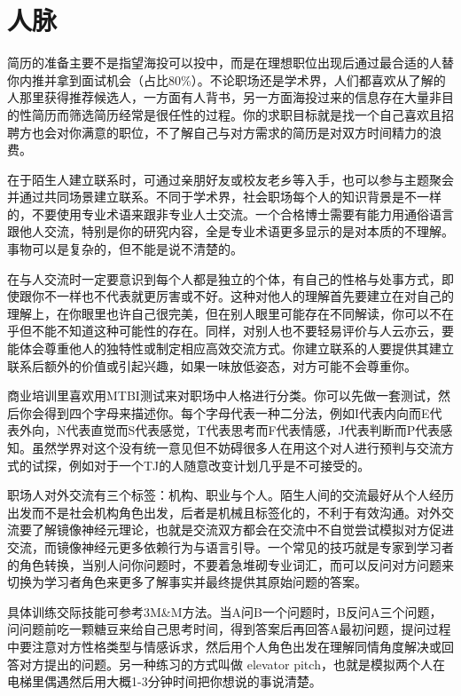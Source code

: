 \documentclass[]{tufte-book}
\begin{document}
\hypertarget{ux4ebaux8109}{%
\section{人脉}\label{ux4ebaux8109}}

简历的准备主要不是指望海投可以投中，而是在理想职位出现后通过最合适的人替你内推并拿到面试机会（占比80\%）。不论职场还是学术界，人们都喜欢从了解的人那里获得推荐候选人，一方面有人背书，另一方面海投过来的信息存在大量非目的性简历而筛选简历经常是很任性的过程。你的求职目标就是找一个自己喜欢且招聘方也会对你满意的职位，不了解自己与对方需求的简历是对双方时间精力的浪费。

在于陌生人建立联系时，可通过亲朋好友或校友老乡等入手，也可以参与主题聚会并通过共同场景建立联系。不同于学术界，社会职场每个人的知识背景是不一样的，不要使用专业术语来跟非专业人士交流。一个合格博士需要有能力用通俗语言跟他人交流，特别是你的研究内容，全是专业术语更多显示的是对本质的不理解。事物可以是复杂的，但不能是说不清楚的。

在与人交流时一定要意识到每个人都是独立的个体，有自己的性格与处事方式，即使跟你不一样也不代表就更厉害或不好。这种对他人的理解首先要建立在对自己的理解上，在你眼里也许自己很完美，但在别人眼里可能存在不同解读，你可以不在乎但不能不知道这种可能性的存在。同样，对别人也不要轻易评价与人云亦云，要能体会尊重他人的独特性或制定相应高效交流方式。你建立联系的人要提供其建立联系后额外的价值或引起兴趣，如果一味放低姿态，对方可能不会尊重你。

商业培训里喜欢用MTBI测试来对职场中人格进行分类。你可以先做一套测试，然后你会得到四个字母来描述你。每个字母代表一种二分法，例如I代表内向而E代表外向，N代表直觉而S代表感觉，T代表思考而F代表情感，J代表判断而P代表感知。虽然学界对这个没有统一意见但不妨碍很多人在用这个对人进行预判与交流方式的试探，例如对于一个TJ的人随意改变计划几乎是不可接受的。

职场人对外交流有三个标签：机构、职业与个人。陌生人间的交流最好从个人经历出发而不是社会机构角色出发，后者是机械且标签化的，不利于有效沟通。对外交流要了解镜像神经元理论，也就是交流双方都会在交流中不自觉尝试模拟对方促进交流，而镜像神经元更多依赖行为与语言引导。一个常见的技巧就是专家到学习者的角色转换，当别人问你问题时，不要着急堆砌专业词汇，而可以反问对方问题来切换为学习者角色来更多了解事实并最终提供其原始问题的答案。

具体训练交际技能可参考3M\&M方法。当A问B一个问题时，B反问A三个问题，问问题前吃一颗糖豆来给自己思考时间，得到答案后再回答A最初问题，提问过程中要注意对方性格类型与情感诉求，然后用个人角色出发在理解同情角度解决或回答对方提出的问题。另一种练习的方式叫做 elevator pitch，也就是模拟两个人在电梯里偶遇然后用大概1-3分钟时间把你想说的事说清楚。
\end{document}
